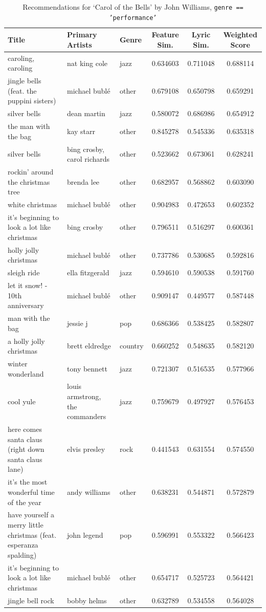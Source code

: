 \documentclass{article}
\begin{document}
\begin{table}[H]
\centering
\tiny
\begin{tabular}{lll|ccc}
Title & Primary Artists & Genre & Feature Sim. & Lyric Sim. & Weighted Score \\
\hline
caroling, caroling & nat king cole & jazz & 0.634603 & 0.711048 & 0.688114 \\
jingle bells (feat. the puppini sisters) & michael bublé & other & 0.679108 & 0.650798 & 0.659291 \\
silver bells & dean martin & jazz & 0.580072 & 0.686986 & 0.654912 \\
the man with the bag & kay starr & other & 0.845278 & 0.545336 & 0.635318 \\
silver bells & bing crosby, carol richards & other & 0.523662 & 0.673061 & 0.628241 \\
rockin' around the christmas tree & brenda lee & other & 0.682957 & 0.568862 & 0.603090 \\
white christmas & michael bublé & other & 0.904983 & 0.472653 & 0.602352 \\
it's beginning to look a lot like christmas & bing crosby & other & 0.796511 & 0.516297 & 0.600361 \\
holly jolly christmas & michael bublé & other & 0.737786 & 0.530685 & 0.592816 \\
sleigh ride & ella fitzgerald & jazz & 0.594610 & 0.590538 & 0.591760 \\
let it snow! - 10th anniversary & michael bublé & other & 0.909147 & 0.449577 & 0.587448 \\
man with the bag & jessie j & pop & 0.686366 & 0.538425 & 0.582807 \\
a holly jolly christmas & brett eldredge & country & 0.660252 & 0.548635 & 0.582120 \\
winter wonderland & tony bennett & jazz & 0.721307 & 0.516535 & 0.577966 \\
cool yule & louis armstrong, the commanders & jazz & 0.759679 & 0.497927 & 0.576453 \\
here comes santa claus (right down santa claus lane) & elvis presley & rock & 0.441543 & 0.631554 & 0.574550 \\
it's the most wonderful time of the year & andy williams & other & 0.638231 & 0.544871 & 0.572879 \\
have yourself a merry little christmas (feat. esperanza spalding) & john legend & pop & 0.596991 & 0.553322 & 0.566423 \\
it's beginning to look a lot like christmas & michael bublé & other & 0.654717 & 0.525723 & 0.564421 \\
jingle bell rock & bobby helms & other & 0.632789 & 0.534558 & 0.564028 \\
\end{tabular}
\vspace{0.5em}
\caption{Recommendations for `Carol of the Bells' by John Williams, \texttt{genre == 'performance'}}
\label{tab:carol-of-the-bells}
\end{table}
\end{document}
